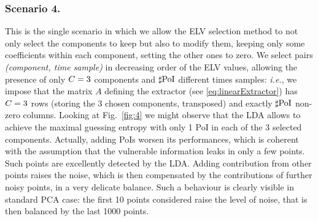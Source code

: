 \subsubsection{Scenario 4.}


This is the single scenario in which we allow the ELV selection method to not only select the components to keep but also to modify them, keeping only some coefficients within each component, setting the other ones to zero. We select pairs \textit{(component, time sample)} in decreasing order of the ELV values, allowing the presence of only $C = 3$ components and $\sharp\mathrm{PoI}$ different times samples: {\em i.e.}, we impose that the matrix $A$ defining the extractor (see \eqref{eq:linearExtractor}) has $C = 3$ rows (storing the 3 chosen components, transposed) and exactly $\sharp\mathrm{PoI}$ non-zero columns.
Looking at Fig.~\ref{fig:4} we might observe that the LDA allows to achieve the maximal guessing entropy with only 1 PoI in each of the 3 selected components. 
Actually, adding PoIs worsen its performances, which is coherent with the assumption that the vulnerable information leaks in only a few points. Such points are excellently detected by the LDA. Adding contribution from other points raises the noise, which is then compensated by the contributions of further noisy points, in a very delicate balance. Such a behaviour is clearly visible in standard PCA case: the first 10 points considered raise the level of noise, that is then balanced by the last 1000 points.


